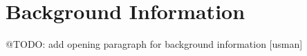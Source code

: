 
\clearpage
\cleardoublepage

\chapter{Background Information}
\label{chap:background_information}

@TODO: add opening paragraph for background information [usman]



\clearpage
